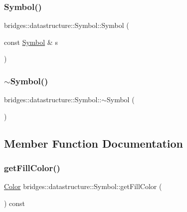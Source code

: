 \subsubsection{\texorpdfstring{Symbol()}{Symbol()}\hspace{0.1cm}{\footnotesize\ttfamily [2/2]}}
{\footnotesize\ttfamily bridges\+::datastructure\+::\+Symbol\+::\+Symbol (\begin{DoxyParamCaption}\item[{const \hyperlink{classbridges_1_1datastructure_1_1_symbol}{Symbol} \&}]{s }\end{DoxyParamCaption})\hspace{0.3cm}{\ttfamily [inline]}}

\mbox{\label{classbridges_1_1datastructure_1_1_symbol_a70c071bd1e73f333c006190c17efba2c}} 
\subsubsection{\texorpdfstring{$\sim$\+Symbol()}{~Symbol()}}
{\footnotesize\ttfamily bridges\+::datastructure\+::\+Symbol\+::$\sim$\+Symbol (\begin{DoxyParamCaption}{ }\end{DoxyParamCaption})\hspace{0.3cm}{\ttfamily [inline]}}



\subsection{Member Function Documentation}
\mbox{\label{classbridges_1_1datastructure_1_1_symbol_aa01f67739906515e00474c43f0ffc66e}} 
\subsubsection{\texorpdfstring{get\+Fill\+Color()}{getFillColor()}}
{\footnotesize\ttfamily \hyperlink{classbridges_1_1datastructure_1_1_color}{Color} bridges\+::datastructure\+::\+Symbol\+::get\+Fill\+Color (\begin{DoxyParamCaption}{ }\end{DoxyParamCaption}) const\hspace{0.3cm}{\ttfamily [inline]}}



